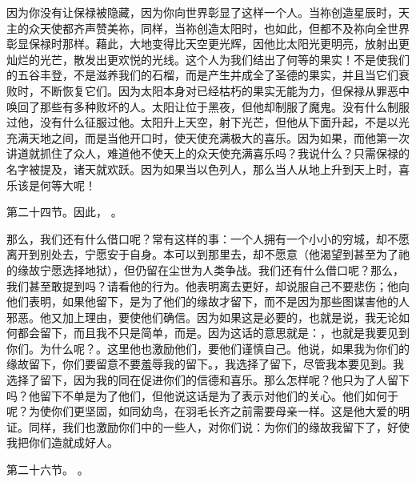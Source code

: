 因为你没有让保禄被隐藏，因为你向世界彰显了这样一个人。当祢创造星辰时，天主的众天使都齐声赞美祢，同样，当祢创造太阳时，也如此，但都不及祢向全世界彰显保禄时那样。藉此，大地变得比天空更光辉，因他比太阳光更明亮，放射出更灿烂的光芒，散发出更欢悦的光线。这个人为我们结出了何等的果实！不是使我们的五谷丰登，不是滋养我们的石榴，而是产生并成全了圣德的果实，并且当它们衰败时，不断恢复它们。因为太阳本身对已经枯朽的果实无能为力，但保禄从罪恶中唤回了那些有多种败坏的人。太阳让位于黑夜，但他却制服了魔鬼。没有什么制服过他，没有什么征服过他。太阳升上天空，射下光芒，但他从下面升起，不是以光充满天地之间，而是当他开口时，使天使充满极大的喜乐。因为如果，而他第一次讲道就抓住了众人，难道他不使天上的众天使充满喜乐吗？我说什么？只需保禄的名字被提及，诸天就欢跃。因为如果当以色列人，那么当人从地上升到天上时，喜乐该是何等大呢！\par

第二十四节。因此， 。\par

那么，我们还有什么借口呢？常有这样的事：一个人拥有一个小小的穷城，却不愿离开到别处去，宁愿安于自身。本可以到那里去，却不愿意（他渴望到甚至为了祂的缘故宁愿选择地狱），但仍留在尘世为人类争战。我们还有什么借口呢？那么，我们甚至敢提到吗？请看他的行为。他表明离去更好，却说服自己不要悲伤；他向他们表明，如果他留下，是为了他们的缘故才留下，而不是因为那些图谋害他的人邪恶。他又加上理由，要使他们确信。因为如果这是必要的，也就是说，我无论如何都会留下，而且我不只是简单，而是。因为这话的意思就是：，也就是我要见到你们。为什么呢？。这里他也激励他们，要他们谨慎自己。他说，如果我为你们的缘故留下，你们要留意不要羞辱我的留下。，我选择了留下，尽管我本要见到。我选择了留下，因为我的同在促进你们的信德和喜乐。那么怎样呢？他只为了人留下吗？他留下不单是为了他们，但他说这话是为了表示对他们的关心。他们如何于呢？为使你们更坚固，如同幼鸟，在羽毛长齐之前需要母亲一样。这是他大爱的明证。同样，我们也激励你们中的一些人，对你们说：为你们的缘故我留下了，好使我把你们造就成好人。\par

第二十六节。 。\par

